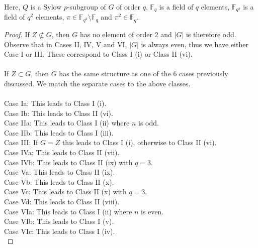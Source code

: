 \begin{theorem}
Here, $Q$ is a Sylow $p$-subgroup of $G$ of order $q$, $\mathbb{F}_q$ is a field of $q$ elements, $\mathbb{F}_{q^2}$ is a field of $q^2$ elements, $\pi \in \mathbb{F}_{q^2} \setminus \mathbb{F}_q$ and $\pi^2 \in \mathbb{F}_q$. \vspace{3mm}
\end{theorem}

\begin{proof}

If $Z \not \subset G$, then $G$ has no element of order 2 and $|G|$ is therefore odd. Observe that in Cases II, IV, V and VI, $|G|$ is always even, thus we have either Case I or III. These correspond to Class I (i) or Class II (vi). \\
\\
If $Z \subset G$, then $G$ has the same structure as one of the 6 cases previously discussed. We match the separate cases to the above classes. \\
\\
Case Ia: This leads to Class I (i). \\
Case Ib: This leads to Class II (vi). \\
Case IIa: This leads to Class I (ii) where $n$ is odd. \\
Case IIb: This leads to Class I (iii). \\
Case III: If $G=Z$ this leads to Class I (i), otherwise to Class II (vi). \\
Case IVa: This leads to Class II (vii). \\
Case IVb: This leads to Class II (ix) with $q=3$. \\
Case Va: This leads to Class II (ix). \\
Case Vb: This leads to Class II (x). \\
Case Vc: This leads to Class II (x) with $q=3$. \\
Case Vd: This leads to Class II (viii). \\
Case VIa: This leads to Class I (ii) where $n$ is even. \\
Case VIb: This leads to Class I (v). \\
Case VIc: This leads to Class I (iv). \\

\end{proof}